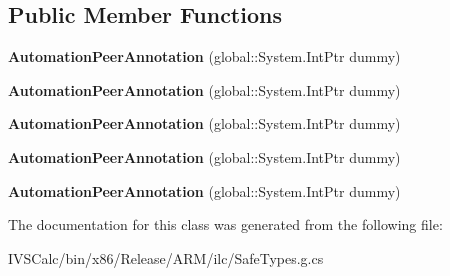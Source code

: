 \subsection*{Public Member Functions}
\begin{DoxyCompactItemize}
\item 
\mbox{\label{class_windows_1_1_u_i_1_1_xaml_1_1_automation_1_1_peers_1_1_automation_peer_annotation_ac669b473eef54d417cebc8763d48156d}} 
{\bfseries Automation\+Peer\+Annotation} (global\+::\+System.\+Int\+Ptr dummy)
\item 
\mbox{\label{class_windows_1_1_u_i_1_1_xaml_1_1_automation_1_1_peers_1_1_automation_peer_annotation_ac669b473eef54d417cebc8763d48156d}} 
{\bfseries Automation\+Peer\+Annotation} (global\+::\+System.\+Int\+Ptr dummy)
\item 
\mbox{\label{class_windows_1_1_u_i_1_1_xaml_1_1_automation_1_1_peers_1_1_automation_peer_annotation_ac669b473eef54d417cebc8763d48156d}} 
{\bfseries Automation\+Peer\+Annotation} (global\+::\+System.\+Int\+Ptr dummy)
\item 
\mbox{\label{class_windows_1_1_u_i_1_1_xaml_1_1_automation_1_1_peers_1_1_automation_peer_annotation_ac669b473eef54d417cebc8763d48156d}} 
{\bfseries Automation\+Peer\+Annotation} (global\+::\+System.\+Int\+Ptr dummy)
\item 
\mbox{\label{class_windows_1_1_u_i_1_1_xaml_1_1_automation_1_1_peers_1_1_automation_peer_annotation_ac669b473eef54d417cebc8763d48156d}} 
{\bfseries Automation\+Peer\+Annotation} (global\+::\+System.\+Int\+Ptr dummy)
\end{DoxyCompactItemize}


The documentation for this class was generated from the following file\+:\begin{DoxyCompactItemize}
\item 
I\+V\+S\+Calc/bin/x86/\+Release/\+A\+R\+M/ilc/Safe\+Types.\+g.\+cs\end{DoxyCompactItemize}
